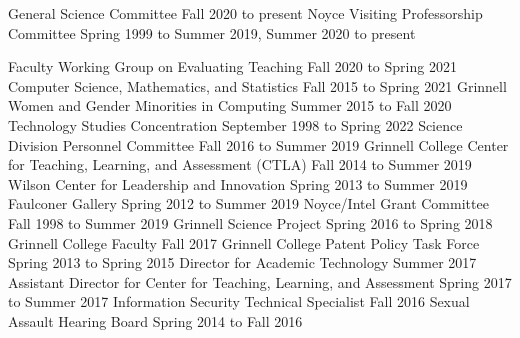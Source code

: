 \begin{cventries}


  {General Science Committee}
  {Fall 2020 to present}
  {Noyce Visiting Professorship Committee}
  {Spring 1999 to Summer 2019, Summer 2020 to present}

\vspace{1mm}


  {Faculty Working Group on Evaluating Teaching}
  {Fall 2020 to Spring 2021}
  {Computer Science, Mathematics, and Statistics}
  {Fall 2015 to Spring 2021}
  {Grinnell Women and Gender Minorities in Computing}
  {Summer 2015 to Fall 2020}
  {Technology Studies Concentration}
  {September 1998 to Spring 2022}
  {Science Division Personnel Committee}
  {Fall 2016 to Summer 2019}
  {Grinnell College Center for Teaching, Learning, and Assessment (CTLA)}
  {Fall 2014 to Summer 2019}
  {Wilson Center for Leadership and Innovation}
  {Spring 2013 to Summer 2019}
  {Faulconer Gallery}
  {Spring 2012 to Summer 2019}
  {Noyce/Intel Grant Committee}
  {Fall 1998 to Summer 2019}
  {Grinnell Science Project}
  {Spring 2016 to Spring 2018}
  {Grinnell College Faculty}
  {Fall 2017}
  {Grinnell College Patent Policy Task Force}
  {Spring 2013 to Spring 2015}
  {Director for Academic Technology}
  {Summer 2017}
  {Assistant Director for Center for Teaching, Learning, and Assessment}
  {Spring 2017 to Summer 2017}
  {Information Security Technical Specialist}
  {Fall 2016}
  {Sexual Assault Hearing Board}
  {Spring 2014 to Fall 2016}

\end{cventries}
